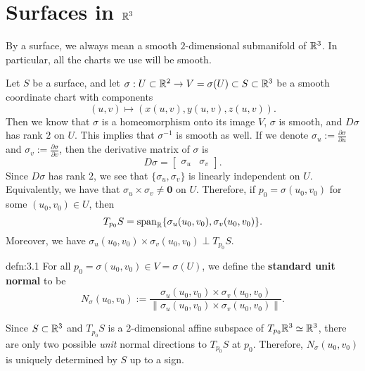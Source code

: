 \section{Surfaces in $\mathbb{R}^3$}\label{sec:3}
By a surface, we always mean a smooth $2$-dimensional submanifold of $\mathbb{R}^3$. 
In particular, all the charts we use will be smooth. 

Let $S$ be a surface, and let $\sigma : U \subset \mathbb{R}^2 \to V = \sigma(U) 
\subset S \subset \mathbb{R}^3$ be a smooth coordinate chart with components 
\[ (u, v) \mapsto (x(u, v), y(u, v), z(u, v)). \] 
Then we know that $\sigma$ is a homeomorphism onto its image $V$, 
$\sigma$ is smooth, and $D\sigma$ has rank $2$ on $U$. This implies that 
$\sigma^{-1}$ is smooth as well. If we denote $\sigma_u 
:= \frac{\partial\sigma}{\partial u}$ and $\sigma_v := 
\frac{\partial\sigma}{\partial v}$, then the derivative matrix of $\sigma$ is 
\[ D\sigma = \left[ \begin{array}{c|c}
    \!\!\!\sigma_u & \sigma_v\!\!\!
\end{array} \right]. \] 
Since $D\sigma$ has rank $2$, we see that $\{\sigma_u, \sigma_v\}$ is 
linearly independent on $U$. Equivalently, we have that $\sigma_u \times 
\sigma_v \neq \mathbf 0$ on $U$. Therefore, if $p_0 = \sigma(u_0, v_0)$ 
for some $(u_0, v_0) \in U$, then 
\[ T_{p_0}S = \operatorname{span}_{\mathbb{R}}\{\sigma_u(u_0, v_0), \sigma_v(u_0, v_0)\}. \] 
Moreover, we have $\sigma_u(u_0, v_0) \times \sigma_v(u_0, v_0) \perp T_{p_0}S$. 

\begin{defn}{defn:3.1}
    For all $p_0 = \sigma(u_0, v_0) \in V = \sigma(U)$, we define 
    the {\bf standard unit normal} to be 
    \[ N_\sigma(u_0, v_0) := \frac{\sigma_u(u_0, v_0) \times \sigma_v(u_0, v_0)}
    {\|\sigma_u(u_0, v_0) \times \sigma_v(u_0, v_0)\|}. \] 
\end{defn}\vspace{-0.25cm}

Since $S \subset \mathbb{R}^3$ and $T_{p_0}S$ is a $2$-dimensional affine subspace of 
$T_{p_0}\mathbb{R}^3 \simeq \mathbb{R}^3$, there are only two possible \emph{unit} normal 
directions to $T_{p_0}S$ at $p_0$. Therefore, $N_\sigma(u_0, v_0)$ is 
uniquely determined by $S$ up to a sign. 

